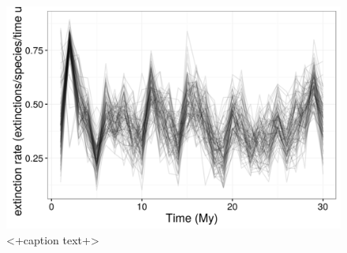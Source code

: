 \documentclass[12pt,letterpaper]{article}
\begin{document}
\begin{figure}[ht]
  \centering
  \includegraphics[width=\textwidth,height=0.8\textheight,keepaspectratio=true]{figure/death_rate}
  \caption{<+caption text+>}
  \label{fig:extinct_rate}
\end{figure}
\end{document}
